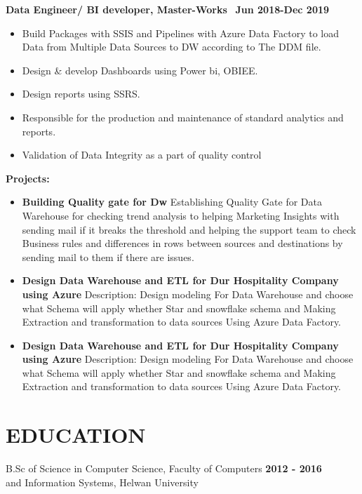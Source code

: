 \documentclass{res}
\begin{document}
\begin{resume}
\vspace{1 mm } 
\textbf{Data Engineer/ BI developer, Master-Works}
\quad \quad  \quad \quad \quad \quad \quad \quad \quad \quad \quad 
\quad \quad \quad\quad \quad \quad \quad \quad \quad\ \quad \textbf{Jun 2018-Dec 2019} 
\vspace{-02 mm}
\begin{itemize}
\item Build Packages with SSIS and Pipelines with Azure Data Factory to load Data from Multiple Data Sources to DW according to The DDM file.
\item Design \& develop Dashboards using Power bi, OBIEE.
\item Design reports using SSRS.
\item Responsible for the production and maintenance of standard analytics and reports.
\item Validation of Data Integrity as a part of quality control
\end{itemize} 
\textbf{Projects:} 
\vspace{2 mm } 
\begin{itemize}
	\item \textbf{Building Quality gate for Dw} Establishing Quality Gate for Data Warehouse for checking trend analysis to helping Marketing
	Insights with sending mail if it breaks the threshold and helping the support team to check Business rules
	and differences in rows between sources and destinations by sending mail to them if there are issues.
	\item \textbf{Design Data Warehouse and ETL for Dur Hospitality Company using Azure}
	Description: Design modeling For Data Warehouse and choose what Schema will apply
	whether Star and snowflake schema and Making Extraction and transformation to data sources
	Using Azure Data Factory.
	\item \textbf{Design Data Warehouse and ETL for Dur Hospitality Company using Azure}
	Description: Design modeling For Data Warehouse and choose what Schema will apply
	whether Star and snowflake schema and Making Extraction and transformation to data sources
	Using Azure Data Factory.
\end {itemize}
\section{EDUCATION}          
    B.Sc of Science in Computer Science, Faculty of Computers \quad \quad
    \quad \quad  
    \quad \quad \quad \quad \quad \quad \quad 
    \quad \quad \quad \quad \quad \quad \quad \quad  \textbf{2012 - 2016} \\
    and Information Systems, Helwan University         


\end{resume}
\end{document}
